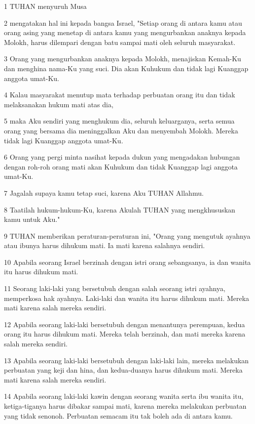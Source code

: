 \par 1 TUHAN menyuruh Musa
\par 2 mengatakan hal ini kepada bangsa Israel, "Setiap orang di antara kamu atau orang asing yang menetap di antara kamu yang mengurbankan anaknya kepada Molokh, harus dilempari dengan batu sampai mati oleh seluruh masyarakat.
\par 3 Orang yang mengurbankan anaknya kepada Molokh, menajiskan Kemah-Ku dan menghina nama-Ku yang suci. Dia akan Kuhukum dan tidak lagi Kuanggap anggota umat-Ku.
\par 4 Kalau masyarakat menutup mata terhadap perbuatan orang itu dan tidak melaksanakan hukum mati atas dia,
\par 5 maka Aku sendiri yang menghukum dia, seluruh keluarganya, serta semua orang yang bersama dia meninggalkan Aku dan menyembah Molokh. Mereka tidak lagi Kuanggap anggota umat-Ku.
\par 6 Orang yang pergi minta nasihat kepada dukun yang mengadakan hubungan dengan roh-roh orang mati akan Kuhukum dan tidak Kuanggap lagi anggota umat-Ku.
\par 7 Jagalah supaya kamu tetap suci, karena Aku TUHAN Allahmu.
\par 8 Taatilah hukum-hukum-Ku, karena Akulah TUHAN yang mengkhususkan kamu untuk Aku."
\par 9 TUHAN memberikan peraturan-peraturan ini, "Orang yang mengutuk ayahnya atau ibunya harus dihukum mati. Ia mati karena salahnya sendiri.
\par 10 Apabila seorang Israel berzinah dengan istri orang sebangsanya, ia dan wanita itu harus dihukum mati.
\par 11 Seorang laki-laki yang bersetubuh dengan salah seorang istri ayahnya, memperkosa hak ayahnya. Laki-laki dan wanita itu harus dihukum mati. Mereka mati karena salah mereka sendiri.
\par 12 Apabila seorang laki-laki bersetubuh dengan menantunya perempuan, kedua orang itu harus dihukum mati. Mereka telah berzinah, dan mati mereka karena salah mereka sendiri.
\par 13 Apabila seorang laki-laki bersetubuh dengan laki-laki lain, mereka melakukan perbuatan yang keji dan hina, dan kedua-duanya harus dihukum mati. Mereka mati karena salah mereka sendiri.
\par 14 Apabila seorang laki-laki kawin dengan seorang wanita serta ibu wanita itu, ketiga-tiganya harus dibakar sampai mati, karena mereka melakukan perbuatan yang tidak senonoh. Perbuatan semacam itu tak boleh ada di antara kamu.

